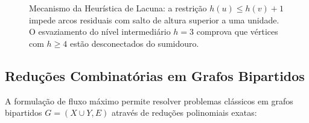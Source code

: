 \begin{figure}[!ht]
\centering

\caption{Mecanismo da Heurística de Lacuna: a restrição $h(u) \le h(v) + 1$ impede arcos residuais com salto de altura superior a uma unidade. O esvaziamento do nível intermediário $h=3$ comprova que vértices com $h \ge 4$ estão desconectados do sumidouro.}
\label{fig:gap_prova}
\end{figure}

\subsection{Reduções Combinatórias em Grafos Bipartidos}

A formulação de fluxo máximo permite resolver problemas clássicos em grafos bipartidos $G = (X \cup Y, E)$ através de reduções polinomiais exatas:

